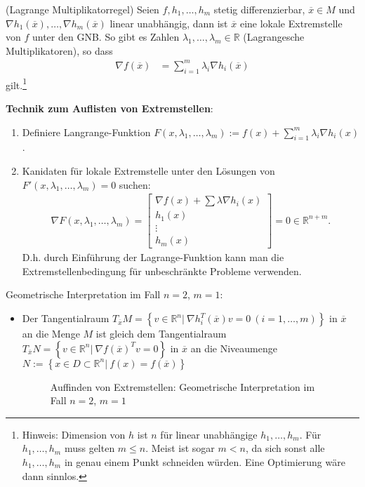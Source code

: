 \begin{satz}\label{satz:3}
(Lagrange Multiplikatorregel) Seien $f,h_1,\ldots,h_m$ stetig differenzierbar, $\overline{x}\in M$ und $\nabla h_1(\overline{x}),\ldots,\nabla h_m(\overline{x})$ linear unabhängig, dann
ist $\overline{x}$ eine lokale Extremstelle von $f$ unter den \ac{GNB}. So gibt es Zahlen $\lambda_1,\ldots,\lambda_m\in\mathbb{R}$ (Lagrangesche Multiplikatoren), so dass
\begin{align*}
\nabla f(\overline{x}) & = \sum\limits_{i=1}^m\lambda_i\nabla h_i(\overline{x})
\end{align*}
gilt.\footnote{Hinweis: Dimension von $h$ ist $n$ für linear unabhängige $h_1,\ldots,h_m$. Für $h_1,\ldots,h_m$
muss gelten $m\le n$. Meist ist sogar $m<n$, da sich sonst alle $h_1,\ldots,h_m$ in genau einem Punkt schneiden würden. Eine Optimierung wäre dann sinnlos.}
\end{satz}
\textbf{Technik zum Auflisten von Extremstellen}:
\begin{enumerate}
  \item Definiere Langrange-Funktion $F(x,\lambda_1,\ldots,\lambda_m):=f(x)+\sum\limits_{i=1}^m\lambda_i\nabla h_i(x)$.
  \item Kanidaten für lokale Extremstelle unter den Lösungen von\\ $F'(x,\lambda_1,\ldots,\lambda_m)=0$ suchen:
	\begin{align*}
	\nabla F(x,\lambda_1,\ldots,\lambda_m)=\begin{bmatrix}
	\nabla f(x)+\sum\lambda\nabla h_i(x)\\
	h_1(x)\\
	\vdots\\
	h_m(x)
	\end{bmatrix} = 0\in\mathbb{R}^{n+m}.
	\end{align*}
	D.h. durch Einführung der Lagrange-Funktion kann man die Extremstellenbedingung für unbeschränkte Probleme verwenden. 
\end{enumerate}
Geometrische Interpretation im Fall $n=2$, $m=1$:
\begin{itemize}
  \item[] Der Tangentialraum $T_{\overline{x}}M=\left\{v\in\mathbb{R}^n|\ \nabla h_i^T(\overline{x})v=0\ (i=1,\ldots,m) \right\} $ in $\overline{x}$ an die Menge $M$ ist gleich dem
  Tangentialraum $T_{\overline{x}}N=\left\{ v\in\mathbb{R}^n|\ \nabla f(\overline{x})^Tv=0 \right\}$ in $\overline{x}$ an die Niveaumenge $N :=\left\{x\in D\subset\mathbb{R}^n|\
  f(x)=f(\overline{x})\right\}$
	\begin{figure}[htb]
	\centering
		
		\caption{Auffinden von Extremstellen: Geometrische Interpretation im Fall $n=2$, $m=1$}
		\label{fig:kap_1_tangraum}
	\end{figure}
\end{itemize}

